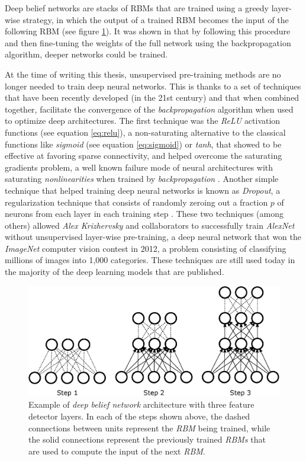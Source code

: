 Deep belief networks are stacks of RBMs that are trained using a greedy layer-wise strategy, in which the output of a trained RBM becomes the input of the following RBM \autocite{hinton2006} (see figure \ref{fig:dbn}). It was shown in \autocite{Bengio2007} that by following this procedure and then fine-tuning the weights of the full network using the backpropagation algorithm, deeper networks could be trained.


At the time of writing this thesis, unsupervised pre-training methods are no longer needed to train deep neural networks. This is thanks to a set of techniques that have been recently developed (in the 21st century) and that when combined together, facilitate the convergence of the \textit{backpropagation} algorithm when used to optimize deep architectures. The first technique was the \textit{ReLU} \autocite{nair2010} activation functions (see equation \ref{eq:relu}), a non-saturating alternative to the classical functions like \textit{sigmoid} (see equation \ref{eq:sigmoid}) or \textit{tanh}, that showed to be effective at favoring sparse connectivity, and helped overcome the saturating gradients problem, a well known failure mode of neural architectures with saturating \textit{nonlinearities} when trained by \textit{backpropagation} \autocite{Hong2019}. Another simple technique that helped training deep neural networks is known as \textit{Dropout}, a regularization technique that consists of randomly zeroing out a fraction $p$ of neurons from each layer in each training step \autocite{hinton2012, srivastava2014}. These two techniques (among others) allowed \textit{Alex Krizhervsky} and collaborators to successfully train \textit{AlexNet} \autocite{krizhevsky2012} without unsupervised layer-wise pre-training, a deep neural network that won the \textit{ImageNet} \autocite{deng2009imagenet} computer vision contest in 2012, a problem consisting of classifying millions of images into 1,000 categories. These techniques are still used today in the majority of the deep learning models that are published.

\begin{figure}
	\centering
	\includegraphics[width=1\linewidth]{background/images/dbn}
	\caption[Deep belief network]{Example of \textit{deep belief network} architecture with three feature detector layers. In each of the steps shown above, the dashed connections between units represent the \textit{RBM} being trained, while the solid connections represent the previously trained \textit{RBMs} that are used to compute the input of the next \textit{RBM}.}
	\label{fig:dbn}
\end{figure}



